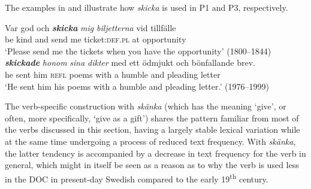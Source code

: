 \documentclass[output=paper]{langscibook}
\begin{document}
\begin{table}
\caption{Frequency measures of the verb-specific DOC with \textit{skicka} ‘send’}
\label{tab:valdeson:19}
\end{table}

The examples in  and  illustrate how \textit{skicka} is used in P1 and P3, respectively.


\ea \label{ex:valdeson:30}
\gll Var   god     och \textbf{\textit{skicka}} \textit{mig} \textit{biljetterna} {vid} {tillfälle}\\
  be        kind    and  send       me   ticket:\textsc{def.pl} at       opportunity\\
\glt `Please send me the tickets when you have the opportunity’ (1800–1844)
\ex \label{ex:valdeson:31}
 \textbf{\textit{skickade}} \textit{honom} \textit{sina} \textit{dikter} med     ett   ödmjukt och bönfallande   brev.\\
  he     sent         him       \textsc{refl}   poems with     a         humble   and pleading     letter\\
\glt `He sent him his poems with a humble and pleading letter.’ (1976–1999)
\z


\label{sec:valdeson:5.3.3.7}



The verb-specific construction with \textit{skänka} (which has the meaning ‘give’, or often, more specifically, ‘give as a gift’) shares the pattern familiar from most of the verbs discussed in this section, having a largely stable lexical variation while at the same time undergoing a process of reduced text frequency. With \textit{skänka}, the latter tendency is accompanied by a decrease in text frequency for the verb in general, which might in itself be seen as a reason as to why the verb is used less in the DOC in present-day Swedish compared to the early 19\textsuperscript{th} century.
\end{document}
